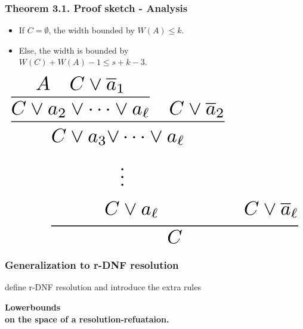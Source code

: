 \documentclass[t,usenames,dvipsnames]{beamer}
\begin{document}
\begin{frame}\frametitle{Theorem 3.1. Proof sketch - Analysis}
	\noindent%
	\begin{minipage}[t]{.67\linewidth}
	\begin{itemize}[<+->]
		\item If $C = \emptyset$, the width bounded by $W(A) \leq k$.
		\item Else, the width is bounded by\\
			\hspace{1cm}$W(C) + W(A) - 1 \leq s + k - 3$.
	\end{itemize}
	\end{minipage}%
	\hfill%
	\begin{minipage}[t]{0.3\linewidth}
	$$
	\resizebox{\hsize}{!}{%
	\infer{C}{
		\infer{\begin{aligned}C \lor a_3 \lor& \dots \lor a_{\ell}\\ &\vdots\\ C &\lor
		a_{\ell} \end{aligned}}
		{
			\infer{C \lor a_2 \lor \dots \lor a_{\ell}}
			{A & C\lor \overline a_1}
		     	&C \lor \overline a_2
		}
	& \begin{aligned}\vphantom{A}\\ \vphantom{\vdots}\\ C \lor \overline
	a_{\ell}\end{aligned}}%
	}
	$$
	\end{minipage}

	\begin{center}%
	\end{center}%
	\pause
\end{frame}

\begin{frame}\frametitle{Generalization to r-DNF resolution}
	define r-DNF resolution and introduce the extra rules
\end{frame}

\begin{frame}[c]
	\color{NavyBlue} \centering \Large \textbf{
	Lowerbounds\\on the space of a resolution-refuataion.}
\end{frame}
\end{document}
